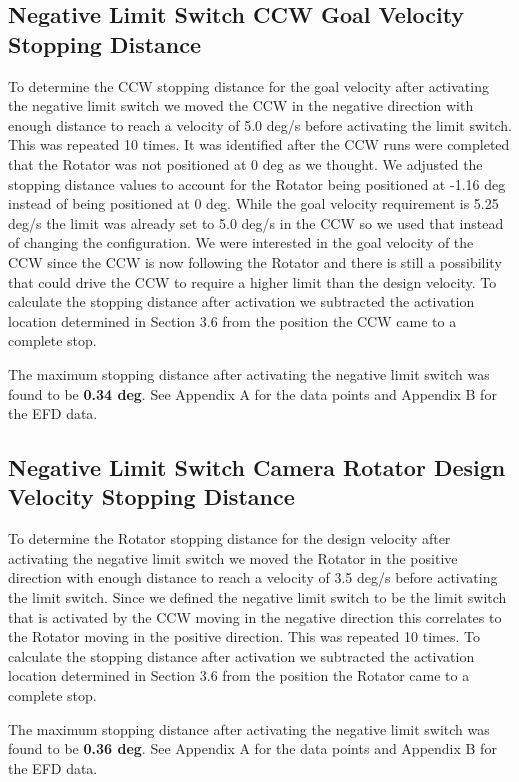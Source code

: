 \documentclass[SE,lsstdraft,authoryear,toc]{lsstdoc}
\begin{document}
\subsection{Negative Limit Switch CCW Goal Velocity Stopping Distance}

To determine the CCW stopping distance for the goal velocity after
activating the negative limit switch we moved the CCW in the negative
direction with enough distance to reach a velocity of 5.0 deg/s before
activating the limit switch. This was repeated 10 times. It was
identified after the CCW runs were completed that the Rotator was not
positioned at 0 deg as we thought. We adjusted the stopping distance
values to account for the Rotator being positioned at -1.16 deg instead
of being positioned at 0 deg. While the goal velocity requirement is
5.25 deg/s the limit was already set to 5.0 deg/s in the CCW so we used
that instead of changing the configuration. We were interested in the
goal velocity of the CCW since the CCW is now following the Rotator and
there is still a possibility that could drive the CCW to require a
higher limit than the design velocity. To calculate the stopping
distance after activation we subtracted the activation location
determined in Section 3.6 from the position the CCW came to a complete
stop.

The maximum stopping distance after activating the negative limit switch
was found to be \textbf{0.34 deg}. See Appendix A for the data points
and Appendix B for the EFD data.

\subsection{Negative Limit Switch Camera Rotator Design Velocity Stopping Distance}

To determine the Rotator stopping distance for the design velocity after
activating the negative limit switch we moved the Rotator in the
positive direction with enough distance to reach a velocity of 3.5 deg/s
before activating the limit switch. Since we defined the negative limit
switch to be the limit switch that is activated by the CCW moving in the
negative direction this correlates to the Rotator moving in the positive
direction. This was repeated 10 times. To calculate the stopping
distance after activation we subtracted the activation location
determined in Section 3.6 from the position the Rotator came to a
complete stop.

The maximum stopping distance after activating the negative limit switch
was found to be \textbf{0.36 deg}. See Appendix A for the data points
and Appendix B for the EFD data.
\end{document}
